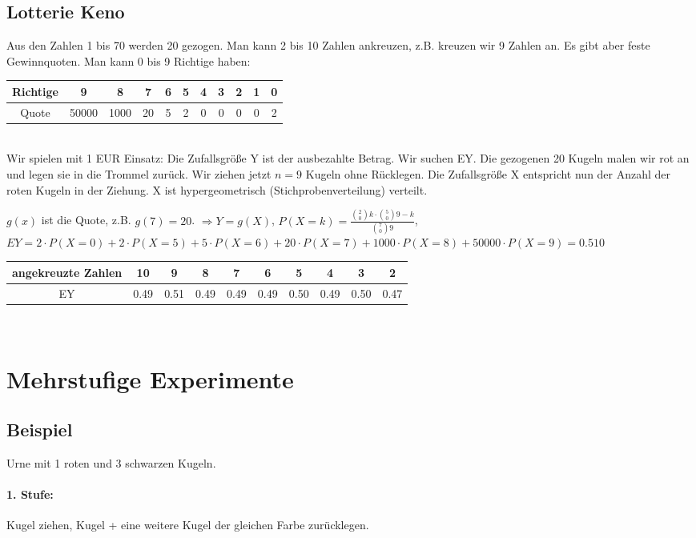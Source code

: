 \renewcommand{\ldate}{2015-11-09}

\subsection{Lotterie Keno}
Aus den Zahlen 1 bis 70 werden 20 gezogen. Man kann 2 bis 10 Zahlen ankreuzen, z.B. kreuzen wir 9 Zahlen an. Es gibt aber feste Gewinnquoten. Man kann 0 bis 9 Richtige haben:\\

\begin{tabular}{|c|c|c|c|c|c|c|c|c|c|c|}
\hline Richtige & 9 & 8 & 7 & 6 & 5 & 4 & 3 & 2 & 1 & 0 \\ 
\hline Quote & 50000 & 1000 & 20 & 5 & 2 & 0 & 0 & 0 & 0 & 2 \\ 
\hline 
\end{tabular}\\

Wir spielen mit 1 EUR Einsatz: Die Zufallsgröße Y ist der ausbezahlte Betrag. Wir suchen EY. Die gezogenen 20 Kugeln malen wir rot an und legen sie in die Trommel zurück. Wir ziehen jetzt $n=9$ Kugeln ohne Rücklegen. Die Zufallsgröße X entspricht nun der Anzahl der roten Kugeln in der Ziehung. X ist hypergeometrisch (Stichprobenverteilung) verteilt. 

$ g(x) $ ist die Quote, z.B. $g(7)=20$. 
$\Rightarrow Y=g(X)$, 
$P(X=k) = \frac{\binom 20 k \cdot \binom 50 {9-k}}{\binom 70 9}$,
$EY = 2 \cdot P(X=0) + 2 \cdot P(X=5) + 5 \cdot P(X=6) + 20 \cdot P(X=7) + 1000 \cdot P(X=8) + 50000 \cdot P(X=9) = 0.510$\\

\begin{tabular}{|c|c|c|c|c|c|c|c|c|c|}
\hline angekreuzte Zahlen & 10 & 9 & 8 & 7 & 6 & 5 & 4 & 3 & 2 \\ 
\hline EY & 0.49 & 0.51 & 0.49 & 0.49 & 0.49 & 0.50 & 0.49 & 0.50 & 0.47 \\ 
\hline 
\end{tabular} \\

\section{Mehrstufige Experimente}
\subsection{Beispiel}
Urne mit 1 roten und 3 schwarzen Kugeln. 
\paragraph{1. Stufe:} Kugel ziehen, Kugel + eine weitere Kugel der gleichen Farbe zurücklegen. 

